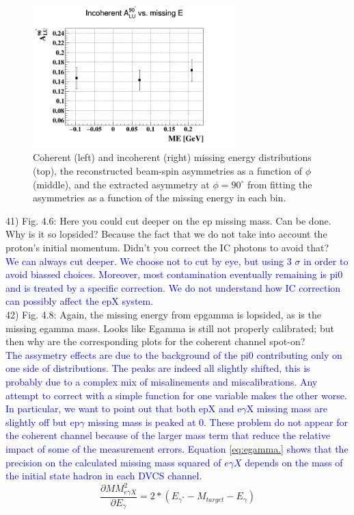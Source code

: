 \begin{figure}[h!]
   \hspace{+0.7cm}
   \includegraphics[height=5.5cm]{fig/incoh_ME_alpha.png}


   \caption{Coherent (left) and incoherent (right) missing energy distributions 
   (top), the reconstructed beam-spin asymmetries as a function of $\phi$ 
(middle), and the extracted asymmetry at $\phi = 90 ^{\circ}$ from fitting the 
asymmetries as a function of the missing energy in each bin. }
   \label{fig:coherent_ME_bins}
    \end{figure}

41) Fig. 4.6: Here you could cut deeper on the ep missing mass. Can be done.
Why is it so lopsided? Because the fact that we do not take into account the 
proton's initial momentum. Didn't you correct the IC photons to avoid that? \\
\textcolor{blue}{We can always cut deeper. We choose not to cut by eye, but 
   using 3 $\sigma$ in order to avoid biassed choices. Moreover, most 
   contamination eventually remaining is pi0 and is treated by a specific 
correction. We do not understand how IC correction can possibly affect the epX 
system.}\\

42) Fig. 4.8: Again, the missing energy from epgamma is lopsided, as is the 
missing egamma mass. Looks like Egamma is still not properly calibrated; but 
then why are the corresponding plots for the coherent channel spot-on? \\
\textcolor{blue}{The assymetry effects are due to the background of the pi0
contributing only on one side of distributions. The peaks are indeed all 
slightly shifted, this is probably due to a complex mix of misalinements and 
miscalibrations. Any attempt to correct with a simple function for one 
variable makes the other worse. In particular, we want to point out that both 
epX and e$\gamma$X missing mass are slightly off but ep$\gamma$ missing mass 
is peaked at 0. These problem do not appear for the coherent channel because
of the larger mass term that reduce the relative impact of some of the
measurement errors. Equation \ref{eq:egamma.} shows that the precision on the 
calculated missing mass squared of $e\gamma X$ depends on the mass of the 
initial state hadron in each DVCS channel.}\\
   \begin{equation}
      \frac{\partial MM^2_{e\gamma X}}{\partial E_{\gamma}}
      = 2*(E_{\gamma^{*}}-M_{target} - E_{\gamma})
      \label{eq:egamma}
   \end{equation}

